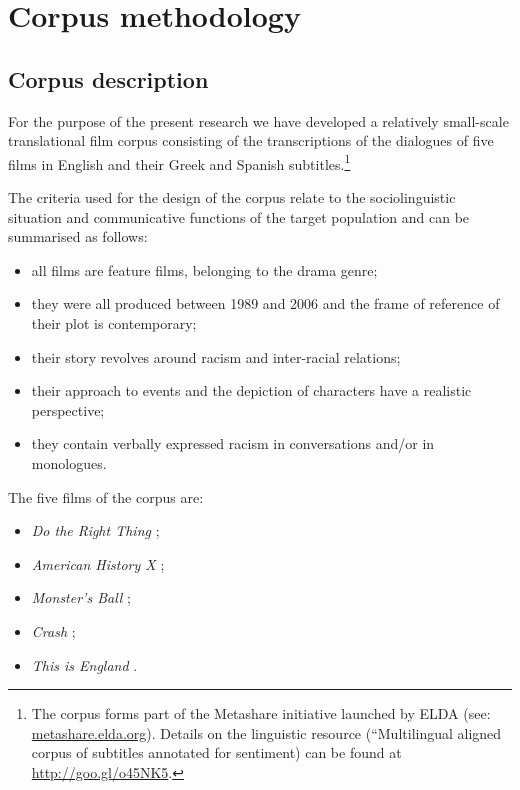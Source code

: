 \documentclass[output=paper]{LSP/langsci}
\begin{document}
\section{Corpus methodology} \label{sec:2:3}

\subsection{Corpus description} \label{sec:2:3:1}

For the purpose of the present research we have developed a relatively small-scale translational film corpus consisting of the transcriptions of the dialogues of five films in English and their Greek and Spanish subtitles.\footnote{The corpus forms part of the Metashare initiative launched by ELDA (see: \url{metashare.elda.org}). Details on the linguistic resource (“Multilingual aligned corpus of subtitles annotated for sentiment) can be found at \url{http://goo.gl/o45NK5}.}

The criteria used for the design of the corpus relate to the sociolinguistic situation and communicative functions \citep[49-52]{Saridakis2010} of the target population and can be summarised as follows:

\begin{itemize}
\item all films are feature films, belonging to the drama genre;
\item they were all produced between 1989 and 2006 and the frame of reference of their plot is contemporary;
\item their story revolves around racism and inter-racial relations;
\item their approach to events and the depiction of characters have a realistic perspective;
\item they contain verbally expressed racism in conversations and/or in monologues.
\end{itemize}

The five films of the corpus are:

\begin{itemize}
\item \textit{Do the Right Thing} \citep{Lee1989};
\item \textit{American History X} \citep{Kaye1998};
\item \textit{Monster's Ball} \citep{Forster2001};
\item \textit{Crash} \citep{Haggis2004};
\item \textit{This is England} \citep{Meadows2006}.
\end{itemize}
\end{document}
